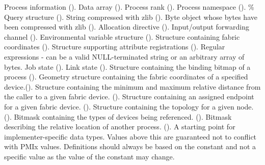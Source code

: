 \begin{constantdesc}
Process information ().
%
Data array ().
%
Process rank ().
%
Process namespace ().
\%
Query structure ().
%
String compressed with zlib ().
%
Byte object whose bytes have been compressed with zlib ().
%
Allocation directive ().
%
Input/output forwarding channel ().
%
Environmental variable structure ().
%
Structure containing fabric coordinates ().
%
Structure supporting attribute registrations ().
%
Regular expressions - can be a valid NULL-terminated string or an arbitrary array of bytes.
%
Job state ().
%
Link state ().
%
Structure containing the binding bitmap of a process ().
%
Geometry structure containing the fabric coordinates of a specified device.().
%
Structure containing the minimum and maximum relative distance from the caller to a given fabric device. ().
%
Structure containing an assigned endpoint for a given fabric device. ().
%
Structure containing the topology for a given node. ().
%
Bitmask containing the types of devices being referenced. ().
%
Bitmask describing the relative location of another process. ().
%
A starting point for implementer-specific data types.
Values above this are guaranteed not to conflict with \ac{PMIx} values.
Definitions should always be based on the  constant and not a specific value as the value of the constant may change.
%
\end{constantdesc}



